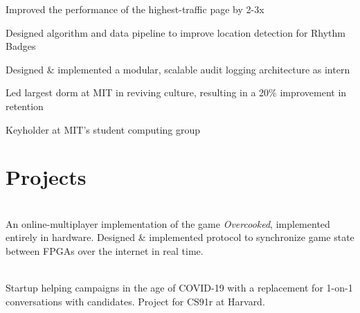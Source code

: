 
\descript{}\hfill \location{}
\begin{tightemize}
    \item {} Improved the performance of the highest-traffic page by 2-3x
    \item {} Designed algorithm and data pipeline to improve location detection for Rhythm Badges
    \item {} Designed \& implemented a modular, scalable audit logging architecture as intern
    \item {} Led largest dorm at MIT in reviving culture, resulting in a 20\% improvement in retention
    \item {} Keyholder at MIT's student computing group
\end{tightemize}
\sectionsep

\section{Projects}
\raggedright

\hfill {}\\
An online-multiplayer implementation of the game \emph{Overcooked}, implemented entirely in hardware. Designed \& implemented protocol to synchronize game state between FPGAs over the internet in real time.
\newline

\hfill {}\\
Startup helping campaigns in the age of COVID-19 with a replacement for 1-on-1 conversations with candidates. Project for CS91r at Harvard.

